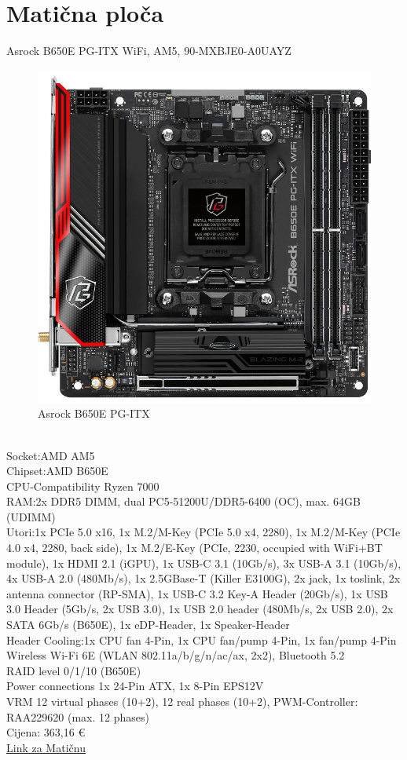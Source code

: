 \documentclass{article}
\begin{document}
\section{Matična ploča}
Asrock B650E PG-ITX WiFi, AM5, 90-MXBJE0-A0UAYZ
\begin{figure}[h]
    \includegraphics[width=12cm]{maticna.jpg}
    \caption{Asrock B650E PG-ITX}
\end{figure}\\
Socket:AMD AM5\\
Chipset:AMD B650E\\
CPU-Compatibility Ryzen 7000\\
RAM:2x DDR5 DIMM, dual PC5-51200U/DDR5-6400 (OC), max. 64GB (UDIMM)\\
Utori:1x PCIe 5.0 x16, 1x M.2/M-Key (PCIe 5.0 x4, 2280), 1x M.2/M-Key (PCIe 4.0 x4, 2280, back side), 1x M.2/E-Key (PCIe, 2230, occupied with WiFi+BT module), 1x HDMI 2.1 (iGPU), 1x USB-C 3.1 (10Gb/s), 3x USB-A 3.1 (10Gb/s), 4x USB-A 2.0 (480Mb/s), 1x 2.5GBase-T (Killer E3100G), 2x jack, 1x toslink, 2x antenna connector (RP-SMA), 1x USB-C 3.2 Key-A Header (20Gb/s), 1x USB 3.0 Header (5Gb/s, 2x USB 3.0), 1x USB 2.0 header (480Mb/s, 2x USB 2.0), 2x SATA 6Gb/s (B650E), 1x eDP-Header, 1x Speaker-Header\\
Header Cooling:1x CPU fan 4-Pin, 1x CPU fan/pump 4-Pin, 1x fan/pump 4-Pin\\
Wireless Wi-Fi 6E (WLAN 802.11a/b/g/n/ac/ax, 2x2), Bluetooth 5.2\\
RAID level 0/1/10 (B650E)\\
Power connections 1x 24-Pin ATX, 1x 8-Pin EPS12V\\
VRM 12 virtual phases (10+2), 12 real phases (10+2), PWM-Controller: RAA229620 (max. 12 phases)\\
Cijena: 363,16 € \\
\href{https://www.adm.hr/asrock-b650e-pg-itx-wifi-am5-90-mxbje0-a0uayz/76019/product/}{Link za Matičnu}
\newpage
\end{document}
